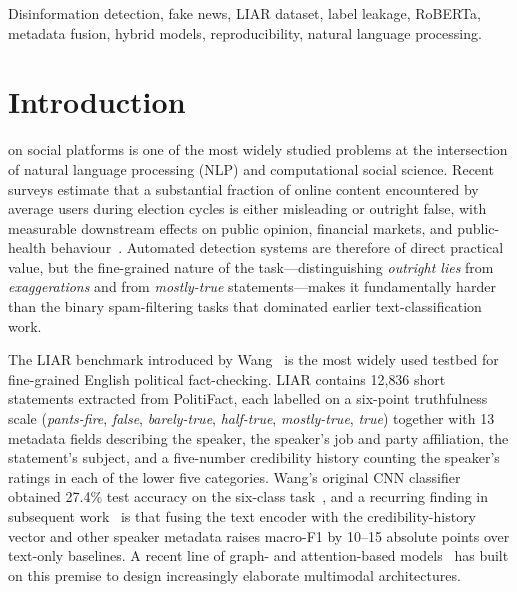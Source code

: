 \documentclass[journal]{IEEEtran}
\begin{document}
\begin{IEEEkeywords}
Disinformation detection, fake news, LIAR dataset, label leakage, RoBERTa, metadata fusion, hybrid models, reproducibility, natural language processing.
\end{IEEEkeywords}

\section{Introduction}
\label{sec:introduction}
 on social platforms is one of the most widely studied problems at the intersection of natural language processing (NLP) and computational social science. Recent surveys estimate that a substantial fraction of online content encountered by average users during election cycles is either misleading or outright false, with measurable downstream effects on public opinion, financial markets, and public-health behaviour~\cite{shu2017,oshikawa2020}. Automated detection systems are therefore of direct practical value, but the fine-grained nature of the task---distinguishing \emph{outright lies} from \emph{exaggerations} and from \emph{mostly-true} statements---makes it fundamentally harder than the binary spam-filtering tasks that dominated earlier text-classification work.

The LIAR benchmark introduced by Wang~\cite{wang2017liar} is the most widely used testbed for fine-grained English political fact-checking. LIAR contains 12{,}836 short statements extracted from PolitiFact, each labelled on a six-point truthfulness scale (\emph{pants-fire}, \emph{false}, \emph{barely-true}, \emph{half-true}, \emph{mostly-true}, \emph{true}) together with 13 metadata fields describing the speaker, the speaker's job and party affiliation, the statement's subject, and a five-number credibility history counting the speaker's ratings in each of the lower five categories. Wang's original CNN classifier obtained 27.4\% test accuracy on the six-class task~\cite{wang2017liar}, and a recurring finding in subsequent work~\cite{shu2017,oshikawa2020,raza2025,papageorgiou2025} is that fusing the text encoder with the credibility-history vector and other speaker metadata raises macro-F1 by 10--15 absolute points over text-only baselines. A recent line of graph- and attention-based models~\cite{zhang2024heterosgt,gu2024,tong2025,zhang2024phd} has built on this premise to design increasingly elaborate multimodal architectures.
\end{document}
